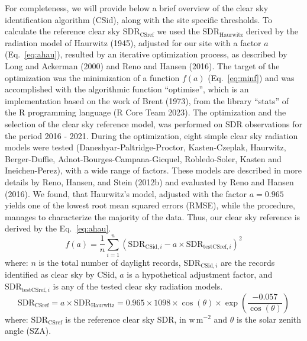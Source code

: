 \documentclass[
  preprint, 3p, authoryear]{article}
\begin{document}
For completeness, we will provide below a brief overview of the
clear sky identification algorithm (CSid),
along with the site specific thresholds.
To calculate the reference clear sky
\(\text{SDR}_\text{CSref}\) we used the \(\text{SDR}_\text{Haurwitz}\) derived by
the radiation model of Haurwitz (1945), adjusted for our site with a
factor \(a\) (Eq.~\ref{eq:ahau}), resulted by an iterative optimization process, as described
by Long and Ackerman (2000) and Reno and Hansen (2016).
The target of
the optimization was the minimization of a function \(f(a)\) (Eq.~\ref{eq:minf}) and
was accomplished with the algorithmic function ``optimise'', which is an implementation based on the work of Brent (1973), from the library ``stats'' of the R programming language (R Core Team 2023).
The optimization and the selection of the clear sky reference model, was performed on SDR observations for the period 2016 - 2021.
During the optimization, eight simple clear sky radiation models were tested (Daneshyar-Paltridge-Proctor, Kasten-Czeplak, Haurwitz, Berger-Duffie, Adnot-Bourges-Campana-Gicquel, Robledo-Soler, Kasten and Ineichen-Perez), with a wide range of factors.
These models are described in more details by Reno, Hansen, and Stein (2012b) and evaluated by Reno and Hansen (2016).
We found, that Haurwitz's model, adjusted with the factor \(a = 0.965\) yields one of the lowest root mean squared errors (RMSE),
while the procedure, manages to characterize the majority of the data.
Thus, our clear sky reference is derived by the Eq.~\ref{eq:ahau}.
\begin{equation}
f(a) = \frac{1}{n}\sum_{i=1}^{n} ( \text{SDR}_{\text{CSid},i} - a \times \text{SDR}_{\text{testCSref},i} )^2 \label{eq:minf}
\end{equation}
where: \(n\) is the total number of daylight records, \(\text{SDR}_{\text{CSid},i}\) are the records identified as clear sky by CSid, \(a\) is a hypothetical adjustment factor, and \(\text{SDR}_{\text{testCSref},i}\) is any of the tested clear sky radiation models.
\begin{equation}
\text{SDR}_\text{CSref} = a \times \text{SDR}_\text{Haurwitz} = 0.965 \times 1098 \times \cos(\theta) \times \exp \left( \frac{ - 0.057}{\cos(\theta)} \right) \label{eq:ahau}
\end{equation}
where: \(\text{SDR}_\text{CSref}\) is the reference clear sky SDR, in \(\text{w}\,\text{m}^{-2}\) and \(\theta\) is the solar zenith angle (SZA).
\end{document}
